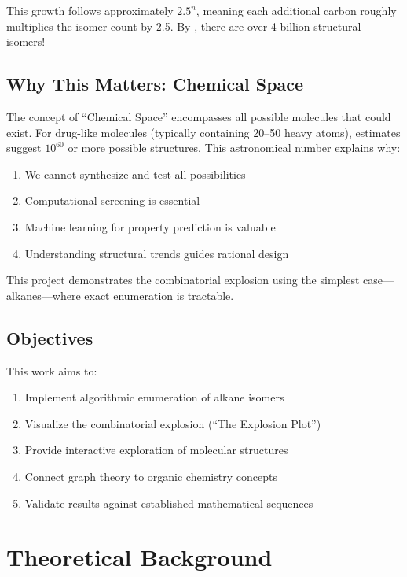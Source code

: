 \documentclass[conference]{IEEEtran}
\begin{document}
This growth follows approximately $2.5^n$, meaning each additional carbon roughly multiplies the isomer count by 2.5. By , there are over 4 billion structural isomers!

\subsection{Why This Matters: Chemical Space}

The concept of ``Chemical Space'' encompasses all possible molecules that could exist. For drug-like molecules (typically containing 20--50 heavy atoms), estimates suggest $10^{60}$ or more possible structures. This astronomical number explains why:

\begin{enumerate}
    \item We cannot synthesize and test all possibilities
    \item Computational screening is essential
    \item Machine learning for property prediction is valuable
    \item Understanding structural trends guides rational design
\end{enumerate}

This project demonstrates the combinatorial explosion using the simplest case---alkanes---where exact enumeration is tractable.

\subsection{Objectives}

This work aims to:
\begin{enumerate}
    \item Implement algorithmic enumeration of alkane isomers
    \item Visualize the combinatorial explosion (``The Explosion Plot'')
    \item Provide interactive exploration of molecular structures
    \item Connect graph theory to organic chemistry concepts
    \item Validate results against established mathematical sequences
\end{enumerate}

\section{Theoretical Background}
\end{document}
